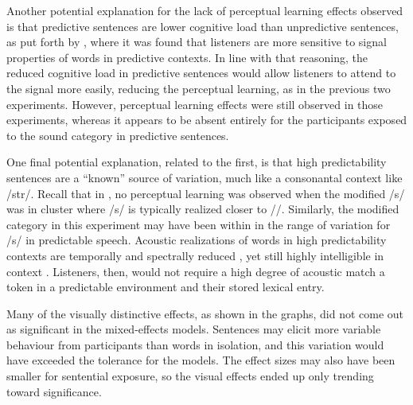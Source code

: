Another potential explanation for the lack of perceptual learning effects observed is that predictive sentences are lower cognitive load than unpredictive sentences, as put forth by \citet{Samuel1981}, where it was found that listeners are more sensitive to signal properties of words in predictive contexts.  
In line with that reasoning, the reduced cognitive load in predictive sentences would allow listeners to attend to the signal more easily, reducing the perceptual learning, as in the previous two experiments.  
However, perceptual learning effects were still observed in those experiments, whereas it appears to be absent entirely for the participants exposed to the sound category in predictive sentences.

One final potential explanation, related to the first, is that high predictability sentences are a ``known'' source of variation, much like a consonantal context like /str/.  
Recall that in \citet{Kraljic2008a}, no perceptual learning was observed when the modified /s/ was in cluster where /s/ is typically realized closer to /\textesh/.  
Similarly, the modified category in this experiment may have been within in the range of variation for /s/ in predictable speech.  
Acoustic realizations of words in high predictability contexts are temporally and spectrally reduced \citep{Scarborough2010}, yet still highly intelligible in context \citep{Kalikow1977}. 
Listeners, then, would not require a high degree of acoustic match a token in a predictable environment and their stored lexical entry.

Many of the visually distinctive effects, as shown in the graphs, did not come out as significant in the mixed-effects models.  
Sentences may elicit more variable behaviour from participants than words in isolation, and this variation would have exceeded the tolerance for the models.  
The effect sizes may also have been smaller for sentential exposure, so the visual effects ended up only trending toward significance.

